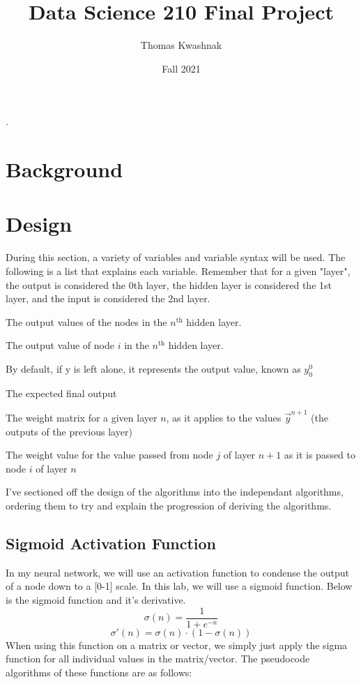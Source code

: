 \documentclass[10pt]{article}
\title{Data Science 210 Final Project}
\author{Thomas Kwashnak}
\date{Fall 2021}
\begin{document}
\maketitle
\setlength{\parindent}{0pt}.
\setlength{\parskip}{\baselineskip}
\lstset{numbers=left, numberstyle=\footnotesize, frame=l} 

\tableofcontents
\newpage

\section{Background}
\section{Design}
During this section, a variety of variables and variable syntax will be used. The following is a list that explains each variable. Remember that for a given "layer", the output is considered the 0th layer, the hidden layer is considered the 1st layer, and the input is considered the 2nd layer.
\begin{description}[style=nextline]
    \item[$\vec{y}^n$] The output values of the nodes in the $n^{\text{th}}$ hidden layer. 
    \item[$y^n_i$] The output value of node $i$ in the $n^{\text{th}}$ hidden layer.
    \item[$y$] By default, if y is left alone, it represents the output value, known as $y^0_0$ 
    \item[$\hat{y}$] The expected final output 
    \item[$W^n$] The weight matrix for a given layer $n$, as it applies to the values $\vec{y}^{n+1}$ (the outputs of the previous layer) 
    \item[$w^n_{i,j}$] The weight value for the value passed from node $j$ of layer $n+1$ as it is passed to node $i$ of layer $n$
\end{description}

I've sectioned off the design of the algorithms into the independant algorithms, ordering them to try and explain the progression of deriving the algorithms. 

\subsection{Sigmoid Activation Function}
In my neural network, we will use an activation function to condense the output of a node down to a [0-1] scale. In this lab, we will use a sigmoid function. Below is the sigmoid function and it's derivative.
$$\sigma(n) = \frac{1}{1 + e^{-n}}$$
$$\sigma'(n) = \sigma(n) \cdot (1 - \sigma(n))$$
When using this function on a matrix or vector, we simply just apply the sigma function for all individual values in the matrix/vector. The pseudocode algorithms of these functions are as follows:
\end{document}
